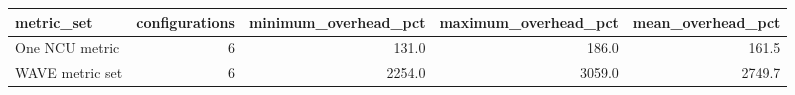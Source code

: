 \begin{tabular}{lrrrr}
\toprule
metric\_set & configurations & minimum\_overhead\_pct & maximum\_overhead\_pct & mean\_overhead\_pct \\
\midrule
One NCU metric & 6 & 131.0 & 186.0 & 161.5 \\
WAVE metric set & 6 & 2254.0 & 3059.0 & 2749.7 \\
\bottomrule
\end{tabular}
